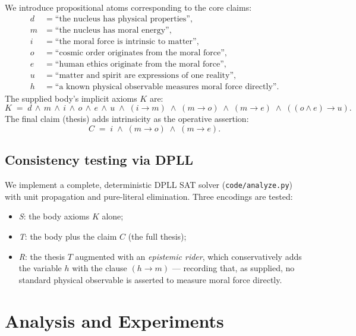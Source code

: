 \documentclass[11pt,a4paper]{article}
\begin{document}
We introduce propositional atoms corresponding to the core claims:
\begin{align*}
  d &= \text{``the nucleus has physical properties''},\\
  m &= \text{``the nucleus has moral energy''},\\
  i &= \text{``the moral force is intrinsic to matter''},\\
  o &= \text{``cosmic order originates from the moral force''},\\
  e &= \text{``human ethics originate from the moral force''},\\
  u &= \text{``matter and spirit are expressions of one reality''},\\
  h &= \text{``a known physical observable measures moral force directly''}.
\end{align*}
The supplied body's implicit axioms $K$ are:
\begin{equation}
K \;=\; d \,\wedge\, m \,\wedge\, i \,\wedge\, o \,\wedge\, e \,\wedge\, u
\;\wedge\; (i \to m) \;\wedge\; (m \to o) \;\wedge\; (m \to e)
\;\wedge\; ((o \wedge e) \to u) .
\label{eq:K}
\end{equation}
The final claim (thesis) adds intrinsicity as the operative assertion:
\begin{equation}
C \;=\; i \;\wedge\; (m \to o) \;\wedge\; (m \to e).
\label{eq:C}
\end{equation}

\subsection{Consistency testing via DPLL}
\label{sec:dpll}

We implement a complete, deterministic DPLL SAT solver
(\texttt{code/analyze.py}) with unit propagation and pure-literal
elimination. Three encodings are tested:
\begin{itemize}[leftmargin=1.4em]
  \item \emph{S}: the body axioms $K$ alone;
  \item \emph{T}: the body plus the claim $C$ (the full thesis);
  \item \emph{R}: the thesis $T$ augmented with an \emph{epistemic rider},
        which conservatively adds the variable $h$ with the clause
        $(h \to m)$ --- recording that, as supplied, no standard physical
        observable is asserted to measure moral force directly.
\end{itemize}

\section{Analysis and Experiments}
\label{sec:analysis}
\end{document}
